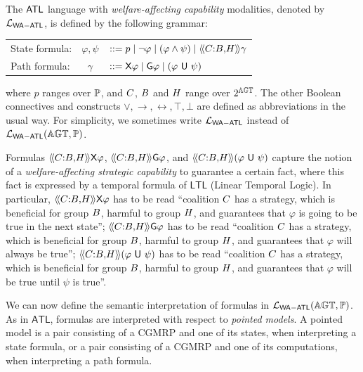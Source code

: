 \documentclass{article}
\begin{document}
The $\mathsf{ATL}$ language with \emph{welfare-affecting capability} modalities, denoted by $\mathcal{L}_{\mathsf{WA{-}ATL}} $, is defined by the following grammar:
\begin{center}\begin{tabular}{lcl}
State formula: &$\varphi, \psi $  & $::= p \mid \neg\varphi \mid (\varphi \wedge \psi )   \mid \langle\!\langle C{:}B{,}H  \rangle\!\rangle\gamma $\\
Path formula: &$\gamma $ & $::= \mathsf{X} \varphi \mid 
\mathsf{G}  \varphi 
 \mid 
 (\varphi \ \mathsf{U} \ \psi)$
\end{tabular}\end{center}
where  $p$
ranges over $\mathbb{P}$, 
and $C$, $B$ and $H$ range over $2^{\mathbb{AGT}}$. 
The other Boolean connectives
and constructs 
$\vee, \rightarrow, \leftrightarrow, \top, \bot $
 are defined as abbreviations in the usual way. 
For simplicity, we sometimes write $\mathcal{L}_{\mathsf{WA{-}ATL}}$ instead of $\mathcal{L}_{\mathsf{WA{-}ATL}}(\mathbb{AGT}, \mathbb{P})$.

 

Formulas 
$\langle\!\langle C{:}B{,}H  \rangle\!\rangle \mathsf{X} \varphi$,
$\langle\!\langle C{:}B{,}H  \rangle\!\rangle \mathsf{G} \varphi$,
and 
$\langle\!\langle C{:}B{,}H  \rangle\!\rangle (\varphi \ \mathsf{U} \ \psi)$
capture the notion of a \emph{welfare-affecting strategic capability} to guarantee a certain fact, where this fact is expressed by a temporal formula of $\mathsf{LTL}$ (Linear Temporal Logic). 
In particular,  
$\langle\!\langle C{:}B{,}H  \rangle\!\rangle
\mathsf{X} \varphi $
has to be read 
``coalition $C$ has 
a strategy,
which is beneficial for group $B$, 
harmful to group $H$, and guarantees that
$\varphi$ is going to be true in the next state'';
$\langle\!\langle C{:}B{,}H  \rangle\!\rangle
 \mathsf{G}\varphi $
has to be read 
``coalition $C$ has 
a strategy,
which is beneficial for group $B$, 
harmful to group $H$, and guarantees that   
 $\varphi$ will always be true''; 
$\langle\!\langle C{:}B{,}H  \rangle\!\rangle
 (\varphi \ \mathsf{U} \ \psi )$
has to be read 
``coalition $C$ has 
a strategy,
which is beneficial for group $B$, 
harmful to group $H$, and guarantees that   
 $\varphi$ will be true until $\psi$ is true''.



We can now define the semantic interpretation of formulas in $\mathcal{L}_{\mathsf{WA{-}ATL}}(\mathbb{AGT}, \mathbb{P})$.  
As in $\mathsf{ATL}$, formulas are interpreted with respect to \emph{pointed models}. 
A pointed model is a pair consisting of a CGMRP and one of its states, when interpreting a state formula, or a pair consisting of a CGMRP and one of its computations, when interpreting a path formula. 
\end{document}
